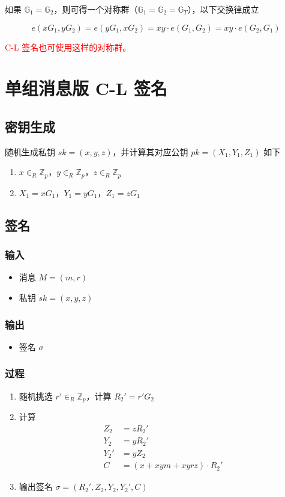 \documentclass[a4paper,10pt]{article}
\newcommand{\bG}{\mathbb{G}}
\newcommand{\bZ}{\mathbb{Z}}
\begin{document}
如果 \(\bG_1 = \bG_2\)，则可得一个对称群（\(\bG_1 = \bG_2 = \bG_T\)），以下交换律成立

\[
  e(xG_1,yG_2) = e(yG_1,xG_2) = xy\cdot e(G_1,G_2) = xy\cdot e(G_2,G_1)
\]

\textcolor{red}{C-L 签名也可使用这样的对称群。}

\section{单组消息版 C-L 签名}
\subsection{密钥生成}
随机生成私钥 \(sk=(x,y,z)\)，并计算其对应公钥 \(pk=(X_1,Y_1,Z_1)\) 如下
\begin{enumerate}
  \item \(x\in_R\bZ_p\)，\(y\in_R\bZ_p\)，\(z\in_R\bZ_p\)
  \item \(X_1=x G_1\)，\(Y_1=y G_1\)，\(Z_1=z G_1\)
\end{enumerate}

\subsection{签名}
\subsubsection{输入}
\begin{itemize}
  \item 消息 \(M=(m,r)\)
  \item 私钥 \(sk=(x,y,z)\)
\end{itemize}

\subsubsection{输出}
\begin{itemize}
  \item 签名 \(\sigma\)
\end{itemize}

\subsubsection{过程}
\begin{enumerate}
  \item 随机挑选 \(r'\in_R\bZ_p\)，计算 \(R_2'=r'G_2\)
  \item 计算
    \begin{align*}
      Z_2 &= zR_2' \\
      Y_2 &= yR_2' \\
      Y_2' &= yZ_2 \\
      C &= (x+xym+xyrz)\cdot R_2'
    \end{align*}
  \item 输出签名 \(\sigma=(R_2',Z_2,Y_2,Y_2',C)\)
\end{enumerate}
\end{document}
